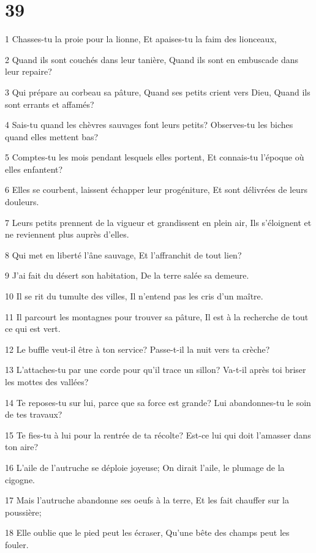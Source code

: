 \chapter{39}

\par 1 Chasses-tu la proie pour la lionne, Et apaises-tu la faim des lionceaux,
\par 2 Quand ils sont couchés dans leur tanière, Quand ils sont en embuscade dans leur repaire?
\par 3 Qui prépare au corbeau sa pâture, Quand ses petits crient vers Dieu, Quand ils sont errants et affamés?
\par 4 Sais-tu quand les chèvres sauvages font leurs petits? Observes-tu les biches quand elles mettent bas?
\par 5 Comptes-tu les mois pendant lesquels elles portent, Et connais-tu l'époque où elles enfantent?
\par 6 Elles se courbent, laissent échapper leur progéniture, Et sont délivrées de leurs douleurs.
\par 7 Leurs petits prennent de la vigueur et grandissent en plein air, Ils s'éloignent et ne reviennent plus auprès d'elles.
\par 8 Qui met en liberté l'âne sauvage, Et l'affranchit de tout lien?
\par 9 J'ai fait du désert son habitation, De la terre salée sa demeure.
\par 10 Il se rit du tumulte des villes, Il n'entend pas les cris d'un maître.
\par 11 Il parcourt les montagnes pour trouver sa pâture, Il est à la recherche de tout ce qui est vert.
\par 12 Le buffle veut-il être à ton service? Passe-t-il la nuit vers ta crèche?
\par 13 L'attaches-tu par une corde pour qu'il trace un sillon? Va-t-il après toi briser les mottes des vallées?
\par 14 Te reposes-tu sur lui, parce que sa force est grande? Lui abandonnes-tu le soin de tes travaux?
\par 15 Te fies-tu à lui pour la rentrée de ta récolte? Est-ce lui qui doit l'amasser dans ton aire?
\par 16 L'aile de l'autruche se déploie joyeuse; On dirait l'aile, le plumage de la cigogne.
\par 17 Mais l'autruche abandonne ses oeufs à la terre, Et les fait chauffer sur la poussière;
\par 18 Elle oublie que le pied peut les écraser, Qu'une bête des champs peut les fouler.
